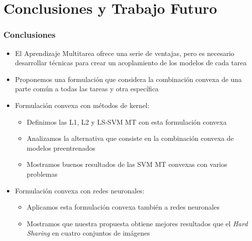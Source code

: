 \documentclass[aspectratio=43,spanish]{beamer}
\begin{document}


\section{Conclusiones y Trabajo Futuro}

\begin{frame}
\frametitle{Conclusiones}
\begin{itemize}
      \item El Aprendizaje Multitarea ofrece una serie de ventajas, pero es necesario desarrollar técnicas para crear un acoplamiento de los modelos de cada tarea
      \item Proponemos una formulación que considera la combinación convexa de una parte común a todas las tareas y otra específica
      \item Formulación convexa con métodos de kernel:
      \begin{itemize}
            \item Definimos las L1, L2 y LS-SVM MT con esta formulación convexa 
            \item Analizamos la alternativa que consiste en la combinación convexa de modelos preentrenados
            \item Mostramos buenos resultados de las SVM MT convexas con varios problemas
      \end{itemize}
      \item Formulación convexa con redes neuronales:
      \begin{itemize}
            \item Aplicamos esta formulación convexa también a redes neuronales
            \item Mostramos que nuestra propuesta obtiene mejores resultados que el \emph{Hard Sharing} en cuatro conjuntos de imágenes
      \end{itemize}
            
\end{itemize}
\end{frame}
\end{document}
